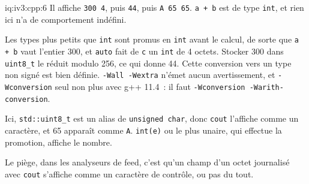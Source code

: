 \begin{solution}{iq:iv3:cpp:6}
Il affiche \texttt{300 4}, puis \texttt{44}, puis \texttt{A 65 65}. \texttt{a + b} est de type \texttt{int}, et rien ici n'a de comportement indéfini.

Les types plus petits que \texttt{int} sont promus en \texttt{int} avant le calcul, de sorte que \texttt{a + b} vaut l'entier 300, et \texttt{auto} fait de \texttt{c} un \texttt{int} de 4 octets. Stocker 300 dans \texttt{uint8\_t} le réduit modulo 256, ce qui donne 44. Cette conversion vers un type non signé est bien définie. \texttt{-Wall -Wextra} n'émet aucun avertissement, et \texttt{-Wconversion} seul non plus avec g++ 11.4~: il faut \texttt{-Wconversion -Warith-conversion}.

Ici, \texttt{std::uint8\_t} est un alias de \texttt{unsigned char}, donc \texttt{cout} l'affiche comme un caractère, et 65 apparaît comme \texttt{A}. \texttt{int(e)} ou le plus unaire, qui effectue la promotion, affiche le nombre.

Le piège, dans les analyseurs de feed, c'est qu'un champ d'un octet journalisé avec \texttt{cout} s'affiche comme un caractère de contrôle, ou pas du tout.

\end{solution}


